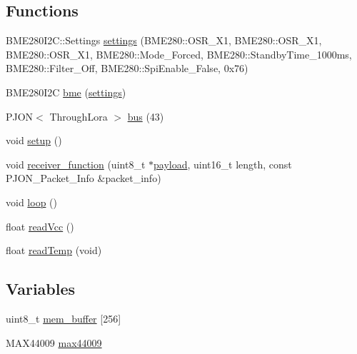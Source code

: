 \subsection*{Functions}
\begin{DoxyCompactItemize}
\item 
B\-M\-E280\-I2\-C\-::\-Settings \hyperlink{OWP__DG__GPS__WeatherStation_8ino_ae54fb4a36d3e9da55d7a93e650f85da0}{settings} (B\-M\-E280\-::\-O\-S\-R\-\_\-\-X1, B\-M\-E280\-::\-O\-S\-R\-\_\-\-X1, B\-M\-E280\-::\-O\-S\-R\-\_\-\-X1, B\-M\-E280\-::\-Mode\-\_\-\-Forced, B\-M\-E280\-::\-Standby\-Time\-\_\-1000ms, B\-M\-E280\-::\-Filter\-\_\-\-Off, B\-M\-E280\-::\-Spi\-Enable\-\_\-\-False, 0x76)
\item 
B\-M\-E280\-I2\-C \hyperlink{OWP__DG__GPS__WeatherStation_8ino_a8b01163c0321eb4ba39ffbb69d7f26e0}{bme} (\hyperlink{OWP__DG__GPS__WeatherStation_8ino_ae54fb4a36d3e9da55d7a93e650f85da0}{settings})
\item 
P\-J\-O\-N$<$ Through\-Lora $>$ \hyperlink{OWP__DG__GPS__WeatherStation_8ino_a4bac4a027aee24f4f811fbd2cfba7541}{bus} (43)
\item 
void \hyperlink{OWP__DG__GPS__WeatherStation_8ino_a4fc01d736fe50cf5b977f755b675f11d}{setup} ()
\item 
void \hyperlink{OWP__DG__GPS__WeatherStation_8ino_a76fc5e73c141f748dcc1809fdcfa1714}{receiver\-\_\-function} (uint8\-\_\-t $\ast$\hyperlink{Uno__Dragino__LoRa__GPS__Shield__TTN_8ino_a78a402d1762842473567de90b11ed256}{payload}, uint16\-\_\-t length, const P\-J\-O\-N\-\_\-\-Packet\-\_\-\-Info \&packet\-\_\-info)
\item 
void \hyperlink{OWP__DG__GPS__WeatherStation_8ino_afe461d27b9c48d5921c00d521181f12f}{loop} ()
\item 
float \hyperlink{OWP__DG__GPS__WeatherStation_8ino_a0b3195c3893f02cb1b80d878b89549d6}{read\-Vcc} ()
\item 
float \hyperlink{OWP__DG__GPS__WeatherStation_8ino_ada109bb0cdc12131465dfe7a74f93b1e}{read\-Temp} (void)
\end{DoxyCompactItemize}
\subsection*{Variables}
\begin{DoxyCompactItemize}
\item 
uint8\-\_\-t \hyperlink{OWP__DG__GPS__WeatherStation_8ino_a02235b4e96743403348a58d554caa3dc}{mem\-\_\-buffer} \mbox{[}256\mbox{]}
\item 
M\-A\-X44009 \hyperlink{OWP__DG__GPS__WeatherStation_8ino_a36efcbcdbef8e49786cb0095ffb923fb}{max44009}
\end{DoxyCompactItemize}


